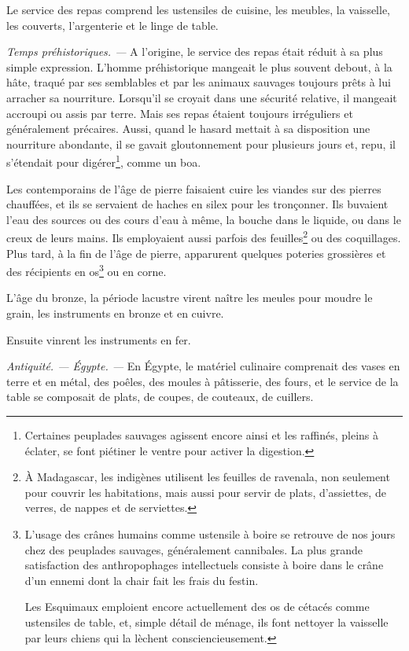 \sk

Le service des repas comprend les ustensiles de cuisine, les meubles, la
vaisselle, les couverts, l'argenterie et le linge de table.

\sk

\textit{Temps préhistoriques. —} A l'origine, le service des repas était réduit
à sa plus simple expression. L'homme préhistorique mangeait le plus souvent
debout, à la hâte, traqué par ses semblables et par les animaux sauvages
toujours prêts à lui arracher sa nourriture. Lorsqu'il se croyait dans une
sécurité relative, il mangeait accroupi ou assis par terre. Mais ses repas
étaient toujours irréguliers et généralement précaires. Aussi, quand le hasard
mettait à sa disposition une nourriture abondante, il se gavait gloutonnement
pour plusieurs jours et, repu, il s'étendait pour digérer\footnote{Certaines
peuplades sauvages agissent encore ainsi et les raffinés, pleins à éclater, se
font piétiner le ventre pour activer la digestion.}, comme un boa.

Les contemporains de l'âge de pierre faisaient cuire les viandes sur des
pierres chauffées, et ils se servaient de haches en silex pour les tronçonner.
Ils buvaient l'eau des sources ou des cours d'eau à même, la bouche dans le
liquide, ou dans le creux de leurs mains. Ils employaient aussi parfois des
feuilles\footnote{À Madagascar, les indigènes utilisent les feuilles de
ravenala, non seulement pour couvrir les habitations, mais aussi pour servir de
plats, d'assiettes, de verres, de nappes et de serviettes.} ou des coquillages.
Plus tard, à la fin de l'âge de pierre, apparurent quelques poteries grossières
et des récipients en os\footnote{L'usage des crânes humains comme ustensile
à boire se retrouve de nos jours chez des peuplades sauvages, généralement
cannibales. La plus grande satisfaction des anthropophages intellectuels
consiste à boire dans le crâne d'un ennemi dont la chair fait les frais du
festin.

Les Esquimaux emploient encore actuellement des os de cétacés comme ustensiles
de table, et, simple détail de ménage, ils font nettoyer la vaisselle par leurs
chiens qui la lèchent consciencieusement.} ou en corne.

L'âge du bronze, la période lacustre virent naître les meules pour moudre le
grain, les instruments en bronze et en cuivre.

Ensuite vinrent les instruments en fer.

\sk

\textit{Antiquité. — Égypte. —} En Égypte, le matériel culinaire comprenait des
vases en terre et en métal, des poêles, des moules à pâtisserie, des fours, et
le service de la table se composait de plats, de coupes, de couteaux, de
cuillers.


